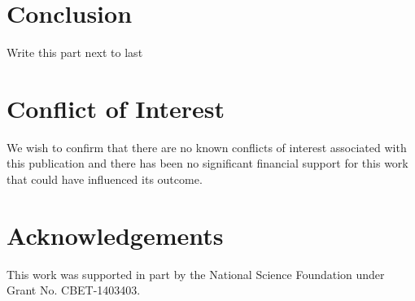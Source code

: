 \documentclass[preprint,12pt, a4paper]{elsarticle}
\begin{document}
\section{Conclusion}
\label{sec:conclusion}

Write this part next to last

\section{Conflict of Interest}
%

We wish to confirm that there are no known conflicts of interest associated with this publication and there has been no significant financial support for this work that could have influenced its outcome.

\section*{Acknowledgements}
\label{acknoledgements}

This work was supported in part by the National Science Foundation under Grant No. CBET-1403403.



\end{document}
